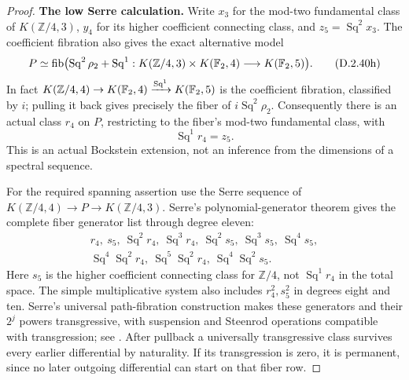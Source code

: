 \begin{proof}
\medskip\noindent
\textbf{The low Serre calculation.}
Write $x_3$ for the mod-two fundamental class of
$K(\mathbb Z/4,3)$, $y_4$ for its higher coefficient connecting
class, and $z_5=\operatorname{Sq}^2x_3$.
The coefficient fibration also gives the exact alternative model
\[
 P\simeq\operatorname{fib}\bigl(
 \operatorname{Sq}^2\rho_2+\operatorname{Sq}^1:
 K(\mathbb Z/4,3)\times K(\mathbb F_2,4)
           \longrightarrow K(\mathbb F_2,5)\bigr).
 \tag{D.2.40h}
\]
In fact $K(\mathbb Z/4,4)\to K(\mathbb F_2,4)
\xrightarrow{\operatorname{Sq}^1}K(\mathbb F_2,5)$ is the coefficient
fibration, classified by $i$; pulling it back gives precisely the
fiber of $i\operatorname{Sq}^2\rho_2$.
Consequently there is an actual class $r_4$ on $P$, restricting
to the fiber's mod-two fundamental class, with
\[
 \operatorname{Sq}^1r_4=z_5.
 \tag{D.2.40i}
\]
This is an actual Bockstein extension, not an inference from
the dimensions of a spectral sequence.

For the required spanning assertion use the Serre sequence of
$K(\mathbb Z/4,4)\to P\to K(\mathbb Z/4,3)$.
Serre's polynomial-generator theorem gives the complete fiber
generator list through degree eleven:
\[
\begin{gathered}
 r_4,\ s_5,\ \operatorname{Sq}^2r_4,\
 \operatorname{Sq}^3r_4,\ \operatorname{Sq}^2s_5,\
 \operatorname{Sq}^3s_5,\ \operatorname{Sq}^4s_5,\\
 \operatorname{Sq}^4\operatorname{Sq}^2r_4,\
 \operatorname{Sq}^5\operatorname{Sq}^2r_4,\
 \operatorname{Sq}^4\operatorname{Sq}^2s_5.
\end{gathered}
 \tag{D.2.40j}
\]
Here $s_5$ is the higher coefficient connecting class for
$\mathbb Z/4$, not $\operatorname{Sq}^1r_4$ in the total space.
The simple multiplicative system also includes $r_4^2,s_5^2$
in degrees eight and ten.
Serre's universal path-fibration construction makes these
generators and their $2^j$ powers transgressive, with suspension
and Steenrod operations compatible with transgression;
see \cite[\S2, no.~7, Theorem~1 and paragraph~7.3,
pp.~201--203; no.~11, Theorem~4 and its proof,
pp.~204--205]{I_Serre1953}.
After pullback a universally transgressive class survives every
earlier differential by naturality.  If its transgression is
zero, it is permanent, since no later outgoing differential can
start on that fiber row.


\end{proof}
